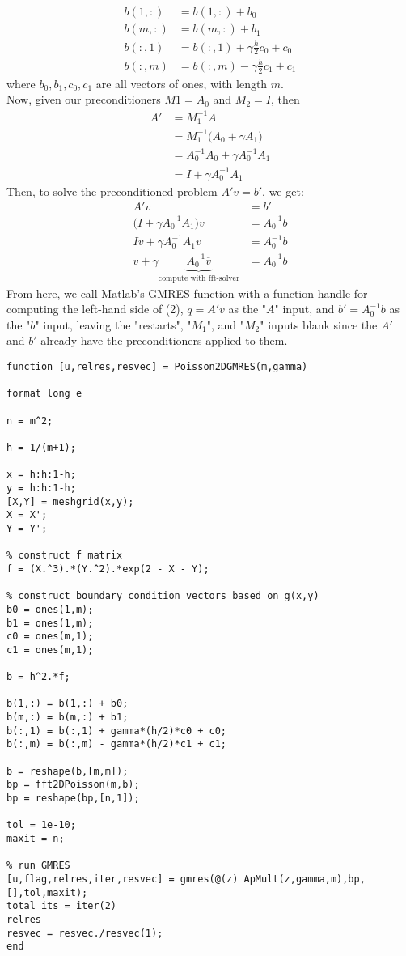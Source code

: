 \documentclass[12pt]{article}
\begin{document}
\begin{align*}
b(1,:) &= b(1,:) + b_0 \\
b(m,:) &= b(m,:) + b_1 \\
b(:,1) &= b(:,1) + \gamma\frac{h}{2}c_0 + c_0 \\
b(:,m) &= b(:,m) - \gamma\frac{h}{2}c_1 + c_1 
\end{align*}
where $b_0, b_1, c_0, c_1$ are all vectors of ones, with length $m$.\\
Now, given our preconditioners $M1 = A_0$ and $M_2 = I$, then 
\begin{align*}
A' &= M_1^{-1}A \\
&= M_1^{-1}\big(A_0 + \gamma A_1\big) \\
&= A_0^{-1}A_0 + \gamma A_0^{-1}A_1 \\
&= I + \gamma A_0^{-1}A_1
\end{align*}
Then, to solve the preconditioned problem $A'v = b'$, we get:
\begin{align}
A'v &= b' \nonumber\\
\big(I + \gamma A_0^{-1}A_1\big)v &= A_0^{-1}b \nonumber\\
Iv + \gamma A_0^{-1}A_1v &= A_0^{-1}b \nonumber\\
v + \gamma\underbrace{A_0^{-1}\overline{v}}_{\text{compute with fft-solver}} &= A_0^{-1}b
\end{align}
From here, we call Matlab's GMRES function with a function handle for computing the left-hand side of (2), $q=A'v$ as the "$A$" input, and $b' = A_0^{-1}b$ as the "$b$" input, leaving the "restarts", "$M_1$", and "$M_2$" inputs blank since the $A'$ and $b'$ already have the preconditioners applied to them.

\lstset{language=matlab,frame=single}
\begin{lstlisting}[caption=Matlab Code to Run GMRES for Poisson Equation with Preconditioner $A_0$]
function [u,relres,resvec] = Poisson2DGMRES(m,gamma)

format long e

n = m^2;

h = 1/(m+1);

x = h:h:1-h;
y = h:h:1-h;
[X,Y] = meshgrid(x,y);
X = X';
Y = Y';

% construct f matrix
f = (X.^3).*(Y.^2).*exp(2 - X - Y);

% construct boundary condition vectors based on g(x,y)
b0 = ones(1,m);
b1 = ones(1,m);
c0 = ones(m,1);
c1 = ones(m,1);

b = h^2.*f;

b(1,:) = b(1,:) + b0;
b(m,:) = b(m,:) + b1;
b(:,1) = b(:,1) + gamma*(h/2)*c0 + c0;
b(:,m) = b(:,m) - gamma*(h/2)*c1 + c1;

b = reshape(b,[m,m]);
bp = fft2DPoisson(m,b);
bp = reshape(bp,[n,1]);

tol = 1e-10;
maxit = n;

% run GMRES
[u,flag,relres,iter,resvec] = gmres(@(z) ApMult(z,gamma,m),bp,[],tol,maxit);
total_its = iter(2)
relres
resvec = resvec./resvec(1);
end
\end{lstlisting}
\end{document}
